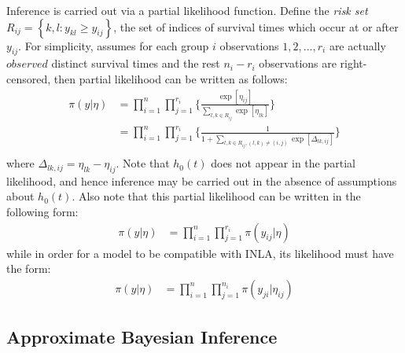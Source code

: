 \documentclass[]{article}
\begin{document}
Inference is carried out via a partial likelihood function. Define the \textit{risk set} $R_{ij} = \left\{k,l : y_{kl} \geq y_{ij}\right\}$, the set of  indices of survival times which occur at or after $y_{ij}$. For simplicity, assumes for each group $i$ observations $1,2,...,r_i$ are actually $observed$ distinct survival times and the rest $n_i - r_i$ observations are right-censored, then partial likelihood can be written as follows:
\begin{equation}\begin{aligned}\label{eqn:partial}
\pi(y|\eta) &= \prod_{i=1}^{n}\prod_{j=1}^{r_{i}} \bigg\{\frac{\exp[\eta_{ij}]}{{\sum_{l,k\in R_{ij}}^{}\exp[\eta_{lk}]}}\bigg \} \\
&= \prod_{i=1}^{n}\prod_{j=1}^{r_{i}} \bigg\{\frac{1}{{1 + \sum_{l,k\in R_{ij} , (l,k) \neq (i,j)}\exp[\Delta_{lk,ij}]}}\bigg \} \\
\end{aligned}\end{equation}
where $\Delta_{lk,ij} = \eta_{lk} - \eta_{ij}$. Note that $h_{0}(t)$ does not appear in the partial likelihood, and hence inference may be carried out in the absence of assumptions about $h_{0}(t)$. Also note that this partial likelihood can be written in the following form:
\begin{equation}\begin{aligned}\label{eqn:whyINLAfail1}
\pi(y|\eta) &= \prod_{i=1}^{n}\prod_{j=1}^{r_{i}} \pi(y_{ij}|\eta)
\end{aligned}\end{equation}
while in order for a model to be compatible with INLA, its likelihood must have the form:
\begin{equation}\begin{aligned}\label{eqn:whyINLAfail2}
\pi(y|\eta) &= \prod_{i=1}^{n}\prod_{j=1}^{n_{i}} \pi(y_{ji}|\eta_{ij})
\end{aligned}\end{equation}

\subsection{Approximate Bayesian Inference}
\end{document}
